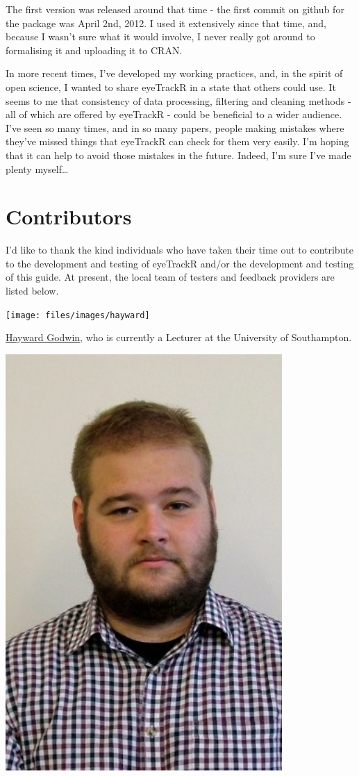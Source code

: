 \documentclass[]{book}
\begin{document}
The first version was released around that time - the first commit on github for the package was April 2nd, 2012. I used it extensively since that time, and, because I wasn't sure what it would involve, I never really got around to formalising it and uploading it to CRAN.

In more recent times, I've developed my working practices, and, in the spirit of open science, I wanted to share eyeTrackR in a state that others could use. It seems to me that consistency of data processing, filtering and cleaning methods - all of which are offered by eyeTrackR - could be beneficial to a wider audience. I've seen so many times, and in so many papers, people making mistakes where they've missed things that eyeTrackR can check for them very easily. I'm hoping that it can help to avoid those mistakes in the future. Indeed, I'm sure I've made plenty myself\ldots{}

\hypertarget{contributors}{%
\section{Contributors}\label{contributors}}

I'd like to thank the kind individuals who have taken their time out to contribute to the development and testing of eyeTrackR and/or the development and testing of this guide. At present, the local team of testers and feedback providers are listed below.

\texttt{[image: files/images/hayward]}

\href{https://twitter.com/haywardgodwin}{Hayward Godwin}, who is currently a Lecturer at the University of Southampton.

\includegraphics[width=4.15in]{files/images/alex}
\end{document}
